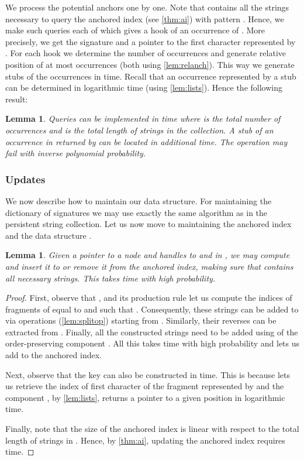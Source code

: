 \documentclass[a4paper]{article}
\newtheorem{lemma}[theorem]{Lemma}
\theoremstyle{remark}
\begin{document}
We process the potential anchors one by one.
Note that  contains all the strings necessary to query the anchored index (see \cref{thm:ai}) with pattern .
Hence, we make such queries each of which gives a hook  of an occurrence of .
More precisely, we get the signature  and a pointer to the first character represented by .
For each hook  we determine the number of occurrences and generate relative position of at most  occurrences (both using \cref{lem:relanch}).
This way we generate stubs of the occurrences in  time.
Recall that an occurrence represented by a stub can be determined in logarithmic time (using \cref{lem:lists}).
Hence the following result:
\begin{lemma}\label{lem:findop}
Queries  can be implemented in  time where  is the total number of occurrences and  is the total length of strings in the collection.
A stub of an occurrence in  returned by  can be located in  additional time.
The  operation may fail with inverse polynomial probability.
\end{lemma}

\subsubsection{Updates}
We now describe how to maintain our data structure.
For maintaining the dictionary  of signatures we may use exactly the same algorithm as in the persistent string collection.
Let us now move to maintaining the anchored index and the data structure .

\begin{lemma}\label{lem:update_ai}
Given a pointer  to a node  and handles to  and  in ,
we may compute  and insert it to or remove it from the anchored index, making sure that  contains all necessary strings.
This takes  time with high probability.
\end{lemma}
\begin{proof}
First, observe that ,  and its production
rule let us compute the indices of fragments of  equal to
 and  such that .
Consequently, these strings can be added to  via  operations (\cref{lem:splitop}) starting from .
Similarly, their reverses can be extracted from .
Finally, all the constructed strings need to be added using  of the order-preserving component .
All this takes  time with high probability and lets us add  to the anchored index.

Next, observe that the key can also be constructed in  time. This is because  lets us retrieve
the index of first character of the fragment represented by  and the component , by \cref{lem:lists},
returns a pointer to a given position in logarithmic time.

Finally, note that the size of the anchored index is linear with respect to the total length of strings in .
Hence, by \cref{thm:ai}, updating the anchored index requires  time.
\end{proof}
\end{document}
